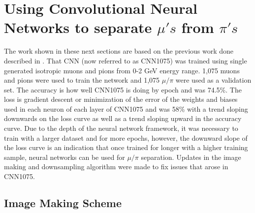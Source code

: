 
\chapter{Using Convolutional Neural Networks to separate ${\mu}'s$ from ${\pi}'s$}


The work shown in these next sections are based on the previous work done described in \cite{priorwork}. That CNN (now referred to as CNN1075) was trained using single generated isotropic muons and pions from 0-2 GeV energy range. 1,075 muons and pions were used to train the network and 1,075 $\mu/\pi$ were used as a validation set. The accuracy is how well CNN1075 is doing by epoch and was 74.5\%. The loss is gradient descent or minimization of the error of the weights and biases used in each neuron of each layer of CNN1075 and was 58\% with a trend sloping downwards on the loss curve as well as a trend sloping upward in the accuracy curve. Due to the depth of the neural network framework, it was necessary to train with a larger dataset and for more epochs, however, the downward slope of the loss curve is an indication that once trained for longer with a higher training sample, neural networks can be used for $\mu/\pi$ separation. Updates in the image making and downsampling algorithm were made to fix issues that arose in CNN1075. 

\section{Image Making Scheme}\label{image_making} 

